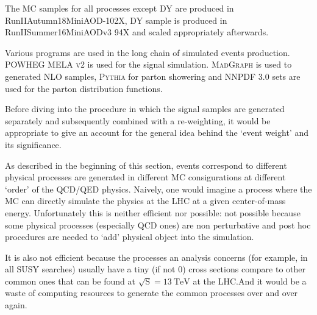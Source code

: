 The MC samples for all processes except DY are produced in RunIIAutumn18MiniAOD-102X,
DY sample is produced in RunIISummer16MiniAODv3 94X and scaled appropriately afterwards. 

Various programs are used in the long chain of simulated events production.
\textsc{POWHEG MELA v2}\xspace\cite{powhegv2} is used for the signal simulation.
\textsc{MadGraph}\xspace\cite{madgraph} is used to generated NLO samples, 
\textsc{Pythia}\xspace\cite{pythia} for parton
showering and \textsc{NNPDF} 3.0\cite{nnpdf} sets are used for the parton distribution functions.

Before diving into the procedure in which the signal samples are generated separately and
subsequently combined with a re-weighting, it would be appropriate to give
an account for the general idea behind the `event weight' and its significance.

As described in the beginning of this section, events correspond to different physical
processes are generated in different MC consigurations at different `order' of the QCD/QED physics.
Naively, one would imagine a process where the MC can directly simulate the physics at
the LHC at a given center-of-mass energy. Unfortunately this is neither efficient nor possible:
not possible because some physical processes (especially QCD ones) are non perturbative and
post hoc procedures are needed to `add' physical object into the simulation. 

It is also not efficient because the processes an analysis concerns (for example, in all SUSY
searches) usually have a tiny (if not 0) cross sections compare to other common ones that can be
found at
$\sqrt{\mathrm{S}} = \SI{13}{\tera\electronvolt}$ at the LHC.\@ And it would be a waste of
computing resources to generate the common processes over and over again.

